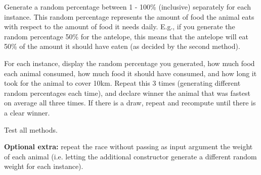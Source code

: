 \documentclass[a4paper,12pt]{article}
\begin{document}
\begin{enumerate}[label=10ø.\arabic*,start=0]
  Generate a random percentage between 1 - 100\% (inclusive) separately for each instance. This random percentage represents the amount of food the animal eats with respect to the amount of food it needs daily. E.g., if you generate the random percentage 50\% for the antelope, this means that the antelope will eat 50\% of the amount it should have eaten (as decided by the second method). 
  
  For each instance, display the random percentage you generated, how much food each animal consumed, how much food it should have consumed, and how long it took for the animal to cover 10km. 
  Repeat this 3 times (generating different random percentages each time), and declare winner the animal that was fastest on average all three times. If there is a draw, repeat and recompute until there is a clear winner.
  
  Test all methods. %
  
  \textbf{Optional extra:} repeat the race without passing as input argument the weight of each animal (i.e. letting the additional constructor generate a different random weight for each instance).
  

\end{enumerate}
\end{document}

